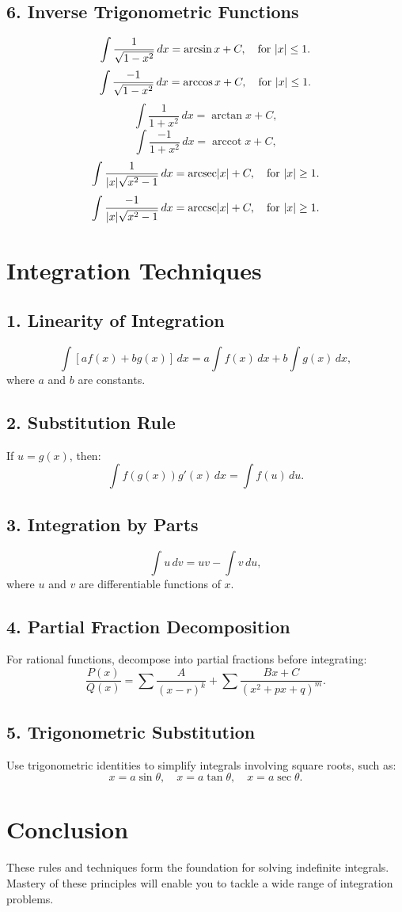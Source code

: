 \documentclass[a4paper,12pt]{article}
\newcommand{\arccot}{\operatorname{arccot}}
\begin{document}
\subsection*{6. Inverse Trigonometric Functions}
\[
\int \frac{1}{\sqrt{1-x^2}} \, dx = \arcsin x + C, \quad \text{for \( |x| \leq 1 \).}
\]
\[
\int \frac{-1}{\sqrt{1-x^2}} \, dx = \arccos x + C, \quad \text{for \( |x| \leq 1 \).}
\]
\[
\int \frac{1}{1+x^2} \, dx = \arctan x + C,
\]
\[
\int \frac{-1}{1+x^2} \, dx = \arccot x + C,
\]
\[
\int \frac{1}{|x|\sqrt{x^2-1}} \, dx = \text{arcsec}|x| + C, \quad \text{for \( |x| \geq 1 \).}
\]
\[
\int \frac{-1}{|x|\sqrt{x^2-1}} \, dx = \text{arccsc}|x| + C, \quad \text{for \( |x| \geq 1 \).}
\]

\section*{Integration Techniques}

\subsection*{1. Linearity of Integration}
\[
\int \left[af(x) + bg(x)\right] \, dx = a\int f(x) \, dx + b\int g(x) \, dx,
\]
where \( a \) and \( b \) are constants.

\subsection*{2. Substitution Rule}
If \( u = g(x) \), then:
\[
\int f(g(x))g'(x) \, dx = \int f(u) \, du.
\]

\subsection*{3. Integration by Parts}
\[
\int u \, dv = uv - \int v \, du,
\]
where \( u \) and \( v \) are differentiable functions of \( x \).

\subsection*{4. Partial Fraction Decomposition}
For rational functions, decompose into partial fractions before integrating:
\[
\frac{P(x)}{Q(x)} = \sum \frac{A}{(x-r)^k} + \sum \frac{Bx+C}{(x^2+px+q)^m}.
\]

\subsection*{5. Trigonometric Substitution}
Use trigonometric identities to simplify integrals involving square roots, such as:
\[
x = a\sin \theta, \quad x = a\tan \theta, \quad x = a\sec \theta.
\]

\section*{Conclusion}
These rules and techniques form the foundation for solving indefinite integrals. Mastery of these principles will enable you to tackle a wide range of integration problems.
\end{document}
